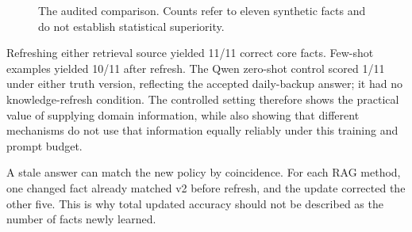 \documentclass[11pt,letterpaper,oneside]{report}
\begin{document}
\begin{figure}[htbp]\centering
{}
\caption{The audited comparison. Counts refer to eleven synthetic facts and do not establish statistical superiority.}
\end{figure}

Refreshing either retrieval source yielded 11/11 correct core facts. Few-shot examples yielded 10/11 after refresh. The Qwen zero-shot control scored 1/11 under either truth version, reflecting the accepted daily-backup answer; it had no knowledge-refresh condition. The controlled setting therefore shows the practical value of supplying domain information, while also showing that different mechanisms do not use that information equally reliably under this training and prompt budget.

A stale answer can match the new policy by coincidence. For each RAG method, one changed fact already matched v2 before refresh, and the update corrected the other five. This is why total updated accuracy should not be described as the number of facts newly learned.
\end{document}
